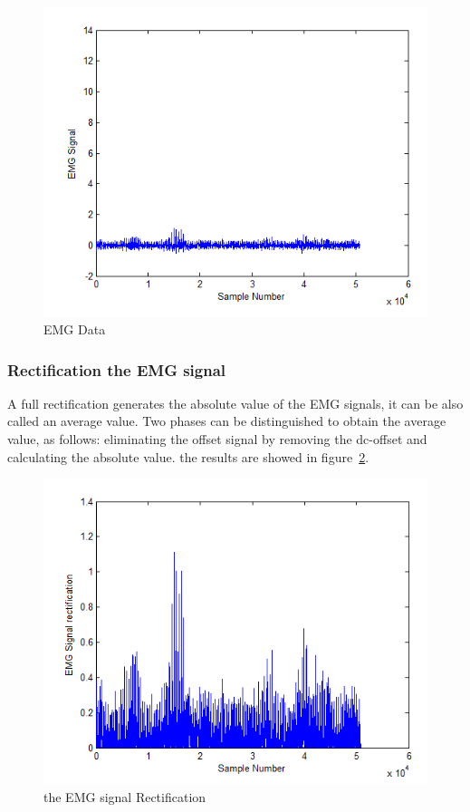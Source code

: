 \documentclass[conference]{IEEEtran}
\begin{document}
\begin{figure}[!hb]
    \hspace*{1.2 cm}
    \includegraphics[scale=0.40]{fig1.png}
    \caption{EMG Data}
    \label{fig:data}
\end{figure}

\subsubsection{Rectification the EMG signal} \label{sub:RectificationtheEMGsignal}\par
A full rectification generates the absolute value of the EMG signals, it can be also called an average value. Two phases can be distinguished to obtain the average value, as follows: eliminating the offset signal by removing the dc-offset and calculating the absolute value. the results are showed in figure~\ref{fig:rect}.\par

\begin{figure}
    \hspace*{1.2 cm}
    \includegraphics[scale=0.40]{fig2.png}
    \caption{the EMG signal Rectification}
    \label{fig:rect}
\end{figure}
\end{document}
